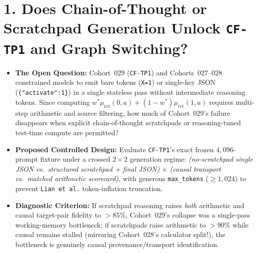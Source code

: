 \section{1. Does Chain-of-Thought or Scratchpad Generation Unlock \texttt{CF-TP1} and Graph Switching?}
\begin{itemize}
  \item \textbf{The Open Question:} Cohort~029 (\texttt{CF-TP1}) and Cohorts~027--028 constrained models to emit bare tokens (\texttt{X=1}) or single-key JSON (\texttt{\{"activate":1\}}) in a single stateless pass without intermediate reasoning tokens. Since computing $w^* \mu_{\mathrm{rct}}(0,a) + (1-w^*)\mu_{\mathrm{rct}}(1,a)$ requires multi-step arithmetic and source filtering, how much of Cohort~029's failure disappears when explicit chain-of-thought scratchpads or reasoning-tuned test-time compute are permitted?
  \item \textbf{Proposed Controlled Design:} Evaluate \texttt{CF-TP1}'s exact frozen $4{,}096$-prompt fixture under a crossed $2\times 2$ generation regime: \emph{(no-scratchpad single JSON vs.\ structured scratchpad + final JSON)} $\times$ \emph{(causal transport vs.\ matched arithmetic scorecard)}, with generous \texttt{max\_tokens} ($\ge 1{,}024$) to prevent \texttt{Lian et al.} token-inflation truncation.
  \item \textbf{Diagnostic Criterion:} If scratchpad reasoning raises \emph{both} arithmetic and causal target-pair fidelity to $>85\%$, Cohort~029's collapse was a single-pass working-memory bottleneck; if scratchpads raise arithmetic to $>90\%$ while causal remains stalled (mirroring Cohort~028's calculator split!), the bottleneck is genuinely causal provenance/transport identification.
\end{itemize}


